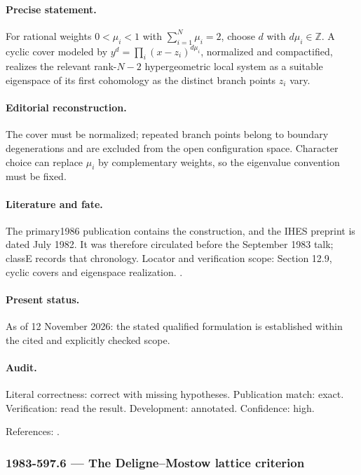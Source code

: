 \paragraph{Precise statement.} For rational weights \(0<\mu_i<1\) with \(\sum_{i=1}^N\mu_i=2\), choose \(d\) with \(d\mu_i\in\mathbb Z\). A cyclic cover modeled by \(y^d=\prod_i(x-z_i)^{d\mu_i}\), normalized and compactified, realizes the relevant rank-\(N-2\) hypergeometric local system as a suitable eigenspace of its first cohomology as the distinct branch points \(z_i\) vary.

\paragraph{Editorial reconstruction.} The cover must be normalized; repeated branch points belong to boundary degenerations and are excluded from the open configuration space. Character choice can replace \(\mu_i\) by complementary weights, so the eigenvalue convention must be fixed.

\paragraph{Literature and fate.} The primary1986 publication contains the construction, and the IHES preprint is dated July 1982. It was therefore circulated before the September 1983 talk; classE records that chronology. Locator and verification scope: Section 12.9, cyclic covers and eigenspace realization. \cite{delignemostow1986monodromy}.

\paragraph{Present status.} As of 12 November 2026: the stated qualified formulation is established within the cited and explicitly checked scope.

\paragraph{Audit.} Literal correctness: correct with missing hypotheses. Publication match: exact. Verification: read the result. Development: annotated. Confidence: high.

\noindent References: \citep{delignemostow1986monodromy}.\par

\subsubsection{1983-597.6 --- The Deligne--Mostow lattice criterion}

